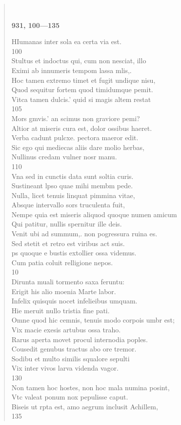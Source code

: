 \documentclass[11pt, a4paper]{report}
\begin{document}
\begin{verse}
        ﻿\pagebreak 
     \marginpar{[356]} \begin{center} \textbf{931, 100—135} \end{center}HIumanas inter sola ea certa via est. \\ 100 \\ Stultus et indoctus qui, cum non nesciat, illo \\ Eximi ab innumeris tempom lassa mlis,. \\ Hoc tamen extremo timet et fugit undique nisu, \\ Quod sequitur fortem quod timidumque pemit. \\ Vitca tamen dulcis.’ quid si magis altem restat \\ 105 \\ Mors gmvis.’ an scimus non graviore pemi? \\ Altior at miseris cura est, dolor ossibus haeret. \\ Verba cadunt pulcxe. pectora maeror edit. \\ Sic ego qui mediecas aliis dare molio herbas, \\ Nullinus credam vulner nosr manu. \\ 110 \\ Vna sed in cunctis data sunt soltia curis. \\ Sustineant lpso quae mihi membm pede. \\ Nulla, licet tenuis linquat pimmina vitae, \\ Absque intervallo sors truculenta fuit, \\ Nempe quia est miseris aliquod quoque numen amicum \\ Qui patitur, nullis spernitur ille deis. \\ Venit ubi ad summum,. non pogressura ruina es. \\ Sed stetit et retro est viribus act suis. \\ ps quoque e bustis extollier ossa videmus. \\ Cum patia coluit relligione nepos. \\ 10 \\ Dirunta muali tormento saxa feruntu: \\ Erigit his alio moenia Marte labor. \\ Infelix quisquis nocet infelieibus umquam. \\ Hie meruit nullo tristia fine pati. \\ Omne quod hic cemnis, tenuis modo corpois umbr est; \\ Vix macie exesis artubus ossa traho. \\ Rarus aperta movet procul internodia poples. \\ Cousedit genubus tractus abo ore tremor. \\ Sodibu et multo similis squalore sepulti \\ Vix inter vivos larva videnda vagor. \\ 130 \\ Non tamen hoc hostes, non hoc mala numina posint, \\ Vtc valeat ponum nox pepulisse caput. \\ Biseis ut rpta est, amo aegrum inclusit Achillem, \\ 135 \\ 

\end{verse}
\end{document}
